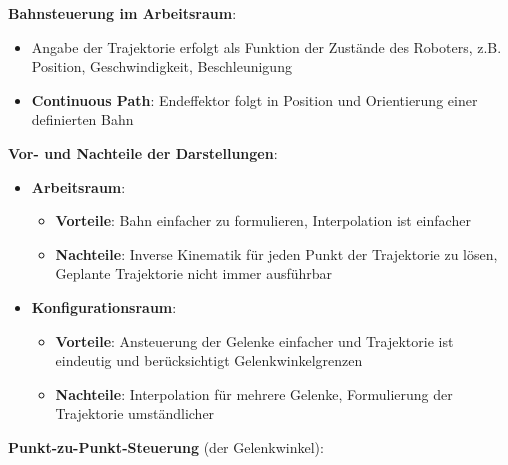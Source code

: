\textbf{Bahnsteuerung im Arbeitsraum}:
\begin{itemize}
	\item Angabe der Trajektorie erfolgt als Funktion der Zustände des Roboters, z.B. Position, Geschwindigkeit, Beschleunigung
	\item \textbf{Continuous Path}: Endeffektor folgt in Position und Orientierung einer definierten Bahn
\end{itemize}

\textbf{Vor- und Nachteile der Darstellungen}:
\begin{itemize}
	\item \textbf{Arbeitsraum}:
	\begin{itemize}
		\item \textbf{Vorteile}: Bahn einfacher zu formulieren, Interpolation ist einfacher
		\item \textbf{Nachteile}: Inverse Kinematik für jeden Punkt der Trajektorie zu lösen, Geplante Trajektorie nicht immer ausführbar
	\end{itemize}
	\item \textbf{Konfigurationsraum}:
	\begin{itemize}
		\item \textbf{Vorteile}: Ansteuerung der Gelenke einfacher und Trajektorie ist eindeutig und berücksichtigt Gelenkwinkelgrenzen
		\item \textbf{Nachteile}: Interpolation für mehrere Gelenke, Formulierung der Trajektorie umständlicher
	\end{itemize}
\end{itemize}
\bigskip
\textbf{Punkt-zu-Punkt-Steuerung} (der Gelenkwinkel):
